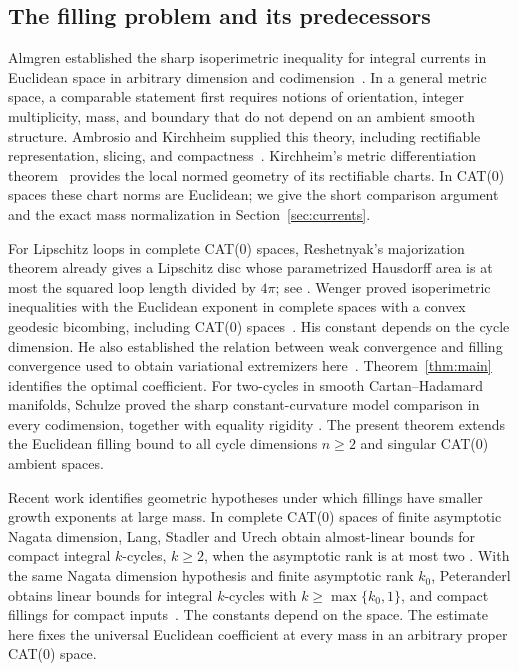 \documentclass[11pt]{article}
\numberwithin{equation}{section}
\theoremstyle{definition}
\theoremstyle{remark}
\begin{document}
\subsection{The filling problem and its predecessors}

Almgren established the sharp isoperimetric inequality for integral
currents in Euclidean space in arbitrary dimension and
codimension~\cite{Almgren1986}. In a general metric space, a comparable
statement first requires notions of orientation, integer multiplicity,
mass, and boundary that do not depend on an ambient smooth structure.
Ambrosio and Kirchheim supplied this theory, including rectifiable
representation, slicing, and compactness~\cite{AK2000}.
Kirchheim's metric differentiation theorem~\cite{Kirchheim1994}
provides the local normed geometry of its rectifiable charts. In CAT(0)
spaces these chart norms are Euclidean; we give the short comparison
argument and the exact mass normalization in Section~\ref{sec:currents}.

For Lipschitz loops in complete CAT(0) spaces, Reshetnyak's majorization
theorem already gives a Lipschitz disc whose parametrized Hausdorff area
is at most the squared loop length divided by $4\pi$; see
\cite[Section~3.2, Lemma~3.2]{LytchakWenger2018}.
Wenger proved isoperimetric inequalities with the Euclidean exponent
in complete spaces with a convex geodesic bicombing, including CAT(0)
spaces~\cite{Wenger2005Iso}. His constant depends on the cycle
dimension. He also established the relation between weak convergence
and filling convergence used to obtain variational extremizers
here~\cite{Wenger2007Flat}. Theorem~\ref{thm:main} identifies the optimal
coefficient. For two-cycles in smooth Cartan--Hadamard manifolds,
Schulze proved the sharp constant-curvature model comparison in every
codimension, together with equality rigidity
\cite[Theorems~1.2--1.3]{Schulze2020}. The present theorem extends the
Euclidean filling bound to all cycle dimensions $n\ge2$ and singular CAT(0)
ambient spaces.

Recent work identifies geometric hypotheses under which fillings
have smaller growth exponents at large mass. In complete CAT(0)
spaces of finite asymptotic Nagata dimension, Lang, Stadler and Urech
obtain almost-linear bounds for compact integral $k$-cycles, $k\ge2$,
when the asymptotic rank is at most two
\cite[Theorem~1.1]{LangStadlerUrech2026}. With the same Nagata dimension
hypothesis and finite asymptotic rank $k_0$, Peteranderl obtains linear
bounds for integral $k$-cycles with $k\ge\max\{k_0,1\}$, and compact
fillings for compact inputs~\cite[Theorem~1.2]{Peteranderl2026}.
The constants depend on the space. The estimate here fixes the universal
Euclidean coefficient at every mass in an arbitrary proper CAT(0) space.
\end{document}
